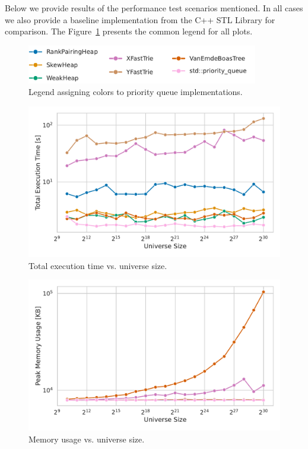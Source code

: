 Below we provide results of the performance test scenarios mentioned. In all cases we also provide a baseline implementation from the C++ STL Library for comparison. The Figure~\ref{fig:structure_legend} presents the common legend for all plots.

\begin{figure}[H]
    \centering
    \includegraphics[width=0.9\textwidth]{figures/plots/legend.pdf}
    \caption{Legend assigning colors to priority queue implementations.}
    \label{fig:structure_legend}
\end{figure}

\begin{figure}[H]
    \centering
    \includegraphics[width=1.0\textwidth]{figures/plots/plot_universe_vs_time.pdf}
    \caption{Total execution time vs. universe size.}
    \label{fig:Xfast_Yfast_performance}
\end{figure}

\begin{figure}[H]
    \centering
    \includegraphics[width=1.0\textwidth]{figures/plots/plot_universe_vs_memory.pdf}
    \caption{Memory usage vs. universe size.}
    \label{fig:vEB_memory}
\end{figure}

